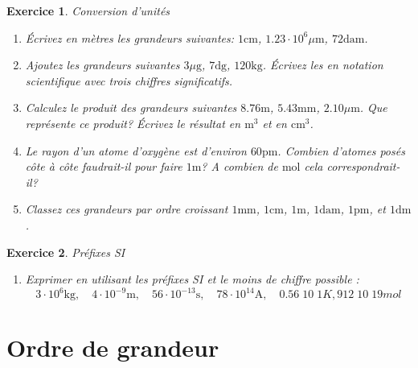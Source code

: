 \documentclass[a4paper,12pt]{book}
\newtheorem{exercice}{Exercice}
\newcommand{\cm}{\mathrm{cm}}
\newcommand{\mm}{\mathrm{mm}}
\newcommand{\mol}{\mathrm{mol}}
\newcommand{\m}{\mathrm{m}}
\newcommand{\s}{\mathrm{s}}
\newcommand{\kg}{\mathrm{kg}}
\newcommand{\g}{\mathrm{g}}
\begin{document}
\begin{exercice}{Conversion d'unités}

\begin{enumerate}
\item Écrivez en mètres les grandeurs suivantes: $1\cm$, $1.23\cdot 10^6\mu\m$, $72\mathrm{da}\m$.
\item Ajoutez les grandeurs suivantes $3\mu\g$, $7\mathrm{d}\g$, $120\kg$. Écrivez les en notation scientifique avec 
trois chiffres significatifs.
\item Calculez le produit des grandeurs suivantes $8.76\m$, $5.43\mm$, $2.10\mu\m$. Que représente ce produit?
Écrivez le résultat en $\m^3$ et en $\cm^3$.
\item Le rayon d'un atome d'oxygène est d'environ $60\mathrm{pm}$. Combien d'atomes posés côte à côte faudrait-il
pour faire $1\m$? A combien de $\mol$ cela correspondrait-il?
\item Classez ces grandeurs par ordre croissant $1\mm$, $1\cm$, $1\m$, $1\mathrm{dam}$, $1\mathrm{pm}$, et $1\mathrm{dm}$.
\end{enumerate}
\end{exercice}

\begin{exercice}{Préfixes SI}

\begin{enumerate}
\item Exprimer en utilisant les préfixes SI et le moins de chiffre possible :
\begin{equation}
3\cdot 10^6\kg,\quad 4\cdot10^{-9}\m,\quad 56\cdot10^{-13}\s,\quad 78\cdot 10^{14} \mathrm{A},\quad 0.56  10  1 K , 912  10  19 mol
\end{equation}
\end{enumerate}
\end{exercice}


\section{Ordre de grandeur}
\end{document}
